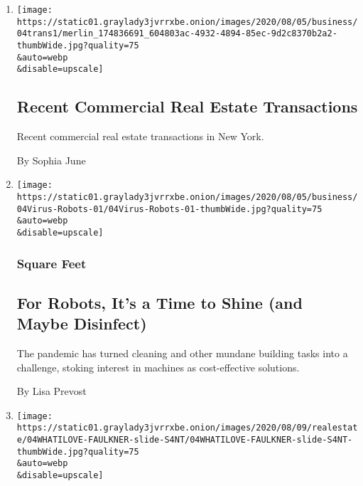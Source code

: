 \begin{enumerate}
\def\labelenumi{\arabic{enumi}.}
\item
  \href{/2020/08/04/business/recent-commercial-real-estate-transactions.html}{}

  \texttt{[image: https://static01.graylady3jvrrxbe.onion/images/2020/08/05/business/04trans1/merlin\_174836691\_604803ac-4932-4894-85ec-9d2c8370b2a2-thumbWide.jpg?quality=75\\\&auto=webp\\\&disable=upscale]}

  \hypertarget{recent-commercial-real-estate-transactions}{%
  \subsection{Recent Commercial Real Estate
  Transactions}\label{recent-commercial-real-estate-transactions}}

  Recent commercial real estate transactions in New York.

  By Sophia June
\item
  \href{/2020/08/04/business/robot-cleaning-coronavirus.html}{}

  \texttt{[image: https://static01.graylady3jvrrxbe.onion/images/2020/08/05/business/04Virus-Robots-01/04Virus-Robots-01-thumbWide.jpg?quality=75\\\&auto=webp\\\&disable=upscale]}

  \hypertarget{square-feet}{%
  \subsubsection{Square Feet}\label{square-feet}}

  \hypertarget{for-robots-its-a-time-to-shine-and-maybe-disinfect}{%
  \subsection{For Robots, It's a Time to Shine (and Maybe
  Disinfect)}\label{for-robots-its-a-time-to-shine-and-maybe-disinfect}}

  The pandemic has turned cleaning and other mundane building tasks into
  a challenge, stoking interest in machines as cost-effective solutions.

  By Lisa Prevost
\item
  \href{/slideshow/2020/08/04/realestate/things-dont-have-to-be-matchy-matchy-and-other-design-tips-from-harris-faulkners-mom.html}{}

  \texttt{[image: https://static01.graylady3jvrrxbe.onion/images/2020/08/09/realestate/04WHATILOVE-FAULKNER-slide-S4NT/04WHATILOVE-FAULKNER-slide-S4NT-thumbWide.jpg?quality=75\\\&auto=webp\\\&disable=upscale]}


\end{enumerate}
